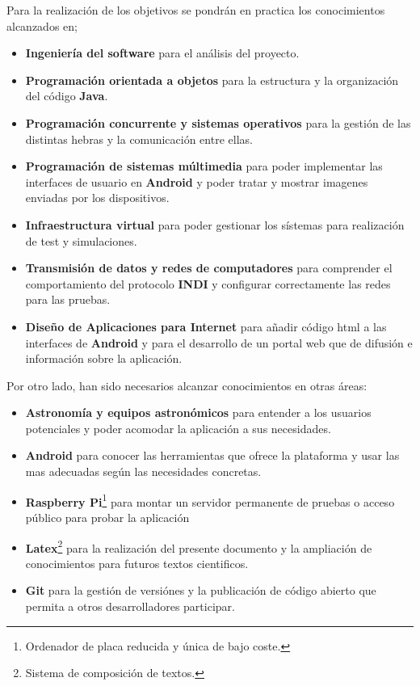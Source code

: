 \bigskip
Para la realización de los objetivos se pondrán en practica los conocimientos alcanzados en;

\begin{itemize}
  \item \textbf{Ingeniería del software} para el análisis del proyecto.
  \item \textbf{Programación orientada a objetos} para la estructura y la organización del código \textbf{Java}.
  \item \textbf{Programación concurrente y sistemas operativos} para la gestión de las distintas hebras y la comunicación entre ellas.
  \item \textbf{Programación de sistemas múltimedia} para poder implementar las interfaces de usuario en \textbf{Android} y poder tratar y mostrar imagenes enviadas por los dispositivos.
  \item \textbf{Infraestructura virtual} para poder gestionar los sístemas para realización de test y simulaciones.
  \item \textbf{Transmisión de datos y redes de computadores} para comprender el comportamiento del protocolo \textbf{INDI} y configurar correctamente las redes para las pruebas.
  \item \textbf{Diseño de Aplicaciones para Internet} para añadir código html a las interfaces de \textbf{Android} y para el desarrollo de un portal web que de difusión e información sobre la aplicación.
\end{itemize}

\bigskip
Por otro lado, han sido necesarios alcanzar conocimientos en otras áreas:

\begin{itemize}
  \item \textbf{Astronomía y equipos astronómicos} para entender a los usuarios potenciales y poder acomodar la aplicación a sus necesidades.
  \item \textbf{Android} para conocer las herramientas que ofrece la plataforma y usar las mas adecuadas según las necesidades concretas.
  \item \textbf{Raspberry Pi}\footnote{Ordenador de placa reducida y única de bajo coste.} para montar un servidor permanente de pruebas o acceso público para probar la aplicación
  \item \textbf{Latex}\footnote{Sistema de composición de textos.} para la realización del presente documento y la ampliación de conocimientos para futuros textos cientificos.
  \item \textbf{Git} para la gestión de versiónes y la publicación de código abierto que permita a otros desarrolladores participar.
\end{itemize}


